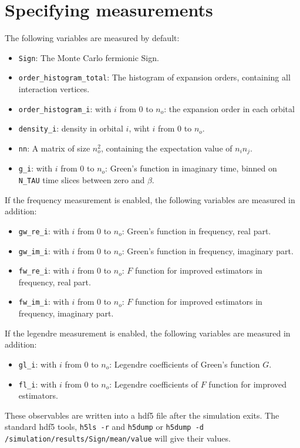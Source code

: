\documentclass[aps,prb,floatfix,superscriptaddress,twocolumn,notitlepage]{revtex4-1}
\begin{document}
\section{Specifying measurements}
The following variables are measured by default:
\begin{itemize}
\item \verb#Sign#: The Monte Carlo fermionic Sign.
\item \verb#order_histogram_total#: The histogram of expansion orders, containing all interaction vertices.
\item \verb#order_histogram_i#: with $i$ from $0$ to $n_o$: the expansion order in each orbital
\item \verb#density_i#: density in orbital $i$, wiht $i$ from $0$ to $n_o$.
\item \verb#nn#: A matrix of size $n_o^2$, containing the expectation value of $n_i n_j$.
\item \verb#g_i#: with $i$ from $0$ to $n_o$: Green's function in imaginary time, binned on \verb#N_TAU# time slices between zero and $\beta$.
\end{itemize}
If the frequency measurement is enabled, the following variables are measured in addition:
\begin{itemize}
\item \verb#gw_re_i#: with $i$ from $0$ to $n_o$: Green's function in frequency, real part.
\item \verb#gw_im_i#: with $i$ from $0$ to $n_o$: Green's function in frequency, imaginary part.
\item \verb#fw_re_i#: with $i$ from $0$ to $n_o$: $F$ function for improved estimators in frequency, real part.
\item \verb#fw_im_i#: with $i$ from $0$ to $n_o$: $F$ function for improved estimators in frequency, imaginary part.
\end{itemize}
If the legendre measurement is enabled, the following variables are measured in addition:
\begin{itemize}
\item \verb#gl_i#: with $i$ from $0$ to $n_o$: Legendre coefficients of Green's function $G$.
\item \verb#fl_i#: with $i$ from $0$ to $n_o$: Legendre coefficients of $F$ function for improved estimators.
\end{itemize}
These observables are written into a hdf5 file after the simulation exits. The standard hdf5 tools, \verb#h5ls -r# and \verb#h5dump# or \verb#h5dump -d /simulation/results/Sign/mean/value# will give their values.
\end{document}
